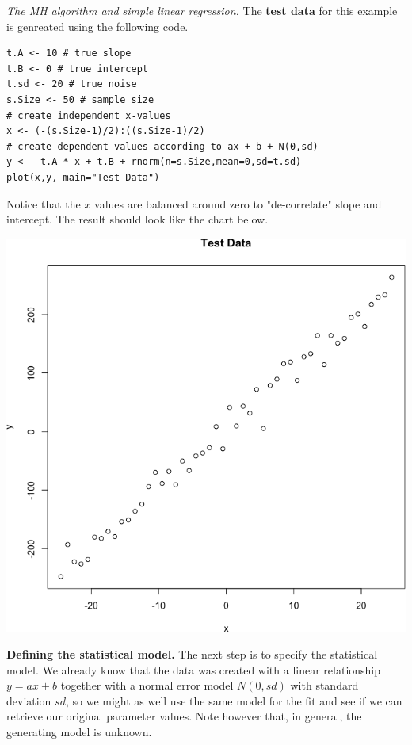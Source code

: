\begin{Example} \textit{The MH algorithm and simple linear regression.} The \textbf{test data} for this example is genreated using the following code. 
\begin{lstlisting}
t.A <- 10 # true slope
t.B <- 0 # true intercept
t.sd <- 20 # true noise
s.Size <- 50 # sample size
# create independent x-values 
x <- (-(s.Size-1)/2):((s.Size-1)/2)
# create dependent values according to ax + b + N(0,sd)
y <-  t.A * x + t.B + rnorm(n=s.Size,mean=0,sd=t.sd)
plot(x,y, main="Test Data")
\end{lstlisting}
\noindent Notice that the $x$ values are balanced around zero to "de-correlate" slope and intercept.  The result should look like the chart below.  
\begin{center}
\includegraphics[width=\linewidth]{Images/example9a.png}
\end{center}

 
\item \textbf{Defining the statistical model.} The next step is to specify the statistical model. We already know that the data was created with a linear relationship $y = ax + b$ together with a  normal error model $N(0,sd)$ with standard deviation $sd$, so we might as well use the same model for the fit and see if we can retrieve our original parameter values. Note however that, in general, the generating model is unknown.



\end{Example}

